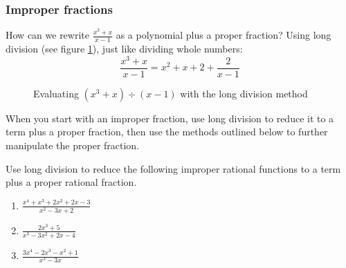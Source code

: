 \subsubsection{Improper fractions}
How can we rewrite $\frac{x^3 + x}{x-1}$ as a polynomial plus a proper
fraction? Using long division (see figure
\ref{polylongdiv}), just like dividing whole numbers:
$$\frac{x^3 + x}{x - 1} = x^2 + x + 2 + \frac{2}{x - 1}$$

\begin{figure}[H]
\centering
    \caption{Evaluating $(x^3 + x) \div (x - 1)$ with the long division method}
    \label{polylongdiv}
\end{figure}

When you start with an improper fraction, use long division to reduce it to a 
term plus a proper fraction, then use the methods outlined below to further 
manipulate the proper fraction. 

\begin{Exercise}[label = improper]
Use long division to reduce the following improper rational functions to a 
term plus a proper rational fraction.
\begin{enumerate}
\item $\frac{x^4 + x^3 + 2x^2 + 2x - 3}{x^2 - 3x + 2}$
\item $\frac{2x^3 + 5}{x^3 - 3x^2 + 2x - 4}$
\item $\frac{3x^4 - 2x^3 - x^2 + 1}{x^3 - 3x}$
\end{enumerate}
\end{Exercise}


